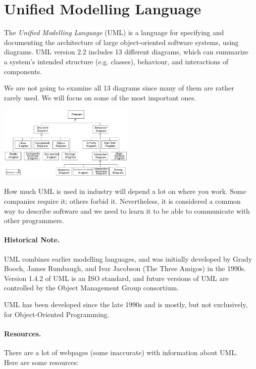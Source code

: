 





\section*{Unified Modelling Language}
The \emph{Unified Modelling Language} (UML) is a language for
specifying and documenting the architecture of large object-oriented
software systems, using diagrams. UML version 2.2 includes 13
different diagrams, which can summarize a system's intended structure
(e.g. classes), behaviour, and interactions of components.

We are not going to examine all 13 diagrams since many of them are rather rarely used. We will focus on some of the most important ones.

\begin{center}
\includegraphics[width=0.5\textwidth]{images/uml-overview}
\end{center}

How much UML is used in industry will depend a lot on where you work. Some companies require it; others forbid it. Nevertheless, it is considered a common way to describe software and we need to learn it to be able to communicate with other programmers.

\paragraph{Historical Note.} UML combines earlier modelling languages,
and was initially developed by Grady Booch, James Rumbaugh, and Ivar
Jacobson (The Three Amigos) in the 1990s. Version 1.4.2 of UML is an ISO
standard, and future versions of UML are controlled by the Object
Management Group consortium.

UML has been developed since the late 1990s and is mostly, but not exclusively, for Object-Oriented Programming.

\paragraph{Resources.} There are a lot of webpages (some inaccurate)
with information about UML. Here are some resources:


